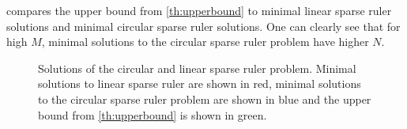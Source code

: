 \documentclass[a4paper, openany, oneside]{memoir}
\begin{document}
 compares the upper bound from \cref{th:upperbound} to minimal linear sparse ruler solutions and minimal circular sparse ruler solutions. One can clearly see that for high $M$, minimal solutions to the circular sparse ruler problem have higher $N$.
\begin{figure}[H]
\caption{Solutions of the circular and linear sparse ruler problem. Minimal solutions to linear sparse ruler are shown in red, minimal solutions to the circular sparse ruler problem are shown in blue and the upper bound from \cref{th:upperbound} is shown in green.}\label{fig:comparison_sparse_ruler}
\end{figure}
\end{document}
